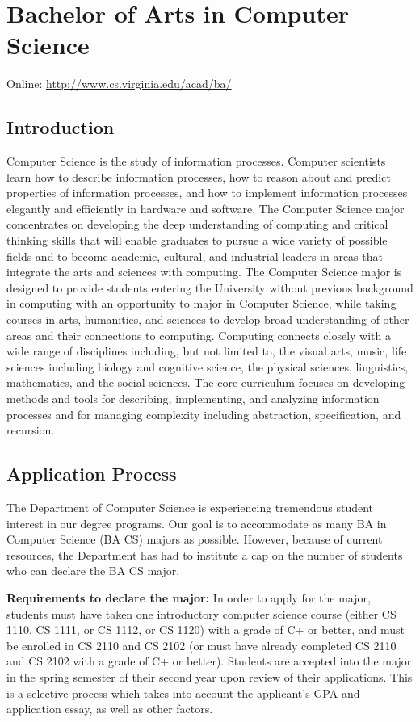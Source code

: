 \documentclass[10pt,letter,twocolumn]{book}
\newcommand{\mychapter}[2]{\chapter{#1}\renewcommand{\leftmark}{\textsc{#2}}}
\newcommand{\mysection}[1]{\section{#1}\renewcommand{\rightmark}{#1}}
\begin{document}
\clearpage
\mychapter{Bachelor of Arts in Computer Science}{BA CS Degree}
\label{bacschapter}

\noindent Online: \url{http://www.cs.virginia.edu/acad/ba/}

\mysection{Introduction}

Computer Science is the study of information processes. Computer
scientists learn how to describe information processes, how to reason
about and predict properties of information processes, and how to
implement information processes elegantly and efficiently in hardware
and software. The Computer Science major concentrates on developing
the deep understanding of computing and critical thinking skills that
will enable graduates to pursue a wide variety of possible fields and
to become academic, cultural, and industrial leaders in areas that
integrate the arts and sciences with computing. The Computer Science
major is designed to provide students entering the University without
previous background in computing with an opportunity to major in
Computer Science, while taking courses in arts, humanities, and
sciences to develop broad understanding of other areas and their
connections to computing. Computing connects closely with a wide range
of disciplines including, but not limited to, the visual arts, music,
life sciences including biology and cognitive science, the physical
sciences, linguistics, mathematics, and the social sciences. The core
curriculum focuses on developing methods and tools for describing,
implementing, and analyzing information processes and for managing
complexity including abstraction, specification, and recursion. 


\mysection{Application Process}
\label{bacsapplicationprocess}

The Department of Computer Science is experiencing tremendous student
interest in our degree programs. Our goal is to accommodate as many BA
in Computer Science (BA CS) majors as possible.  However, because of
current resources, the Department has had to institute a cap on the
number of students who can declare the BA CS major.


{\bf Requirements to declare the major:} In order to apply for the
major, students must have taken one introductory computer science
course (either CS 1110, CS 1111, or CS 1112, or CS 1120) with a grade
of C+ or better, and must be enrolled in CS 2110 and CS 2102 (or must
have already completed CS 2110 and CS 2102 with a grade of C+ or
better). Students are accepted into the major in the spring semester
of their second year upon review of their applications. This is a
selective process which takes into account the applicant's GPA and
application essay, as well as other factors.
\end{document}
